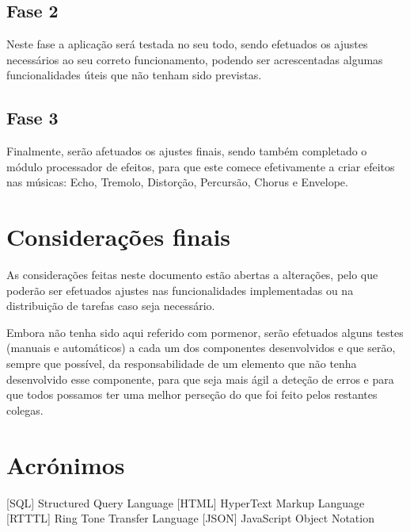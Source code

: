 \documentclass{report}
\begin{document}
\section{Fase 2}
Neste fase a aplicação será testada no seu todo, sendo efetuados os ajustes necessários ao seu correto funcionamento, podendo ser acrescentadas algumas funcionalidades úteis que não tenham sido previstas.
\section{Fase 3}
Finalmente, serão afetuados os ajustes finais, sendo também completado o módulo processador de efeitos, para que este comece efetivamente a criar efeitos nas músicas: Echo, Tremolo, Distorção, Percursão, Chorus e Envelope.

\chapter{Considerações finais}
\label{chap.finais}

As considerações feitas neste documento estão abertas a alterações, pelo que poderão ser efetuados ajustes nas funcionalidades implementadas ou na distribuição de tarefas caso seja necessário.

Embora não tenha sido aqui referido com pormenor, serão efetuados alguns testes (manuais e automáticos) a cada um dos componentes desenvolvidos e que serão, sempre que possível, da responsabilidade de um elemento que não tenha desenvolvido esse componente, para que seja mais ágil a deteção de erros e para que todos possamos ter uma melhor perseção do que foi feito pelos restantes colegas.


\chapter*{Acrónimos}
\begin{acronym}
[SQL] {Structured Query Language}
 [HTML] {HyperText Markup Language}
 [RTTTL] {Ring Tone Transfer Language}
 [JSON] {JavaScript Object Notation}

\end{acronym}


\printbibliography
\end{document}
